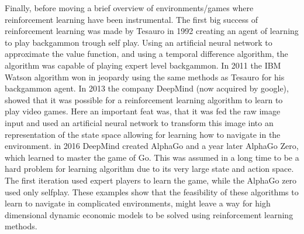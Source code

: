 Finally, before moving a brief overview of environments/games where reinforcement learning have been instrumental. The first big success of reinforcement learning was made by Tesauro in 1992 creating an agent of learning to play backgammon trough self play. Using an artificial neural network to approximate the value function, and using a temporal difference algorithm, the algorithm was capable of playing expert level backgammon. In 2011 the IBM Watson algorithm won in jeopardy using the same methods as Tesauro for his backgammon agent. In 2013 the company DeepMind (now acquired by google), showed that it was possible for a reinforcement learning algorithm to learn to play video games. Here an important feat was, that it was fed the raw image input and used an artificial neural network to transform this image into an representation of the state space allowing for learning how to navigate in the environment. in 2016 DeepMind created AlphaGo and a year later AlphaGo Zero, which learned to master the game of Go. This was assumed in a long time to be a hard problem for learning algorithm due to its very large state and action space. The first iteration used expert players to learn the game, while the AlphaGo zero used only selfplay. These examples show that the feasibility of these algorithms to learn to navigate in complicated environments, might leave a way for high dimensional dynamic economic models to be solved using reinforcement learning methods.